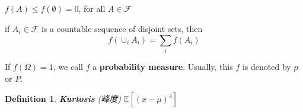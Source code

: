 \documentclass{article}
\newtheorem{definition}{Definition}
\begin{document}
\begin{description}[nosep]
  \item[] $f(A) \leq f(\emptyset) = 0$, for all $A \in \mathcal{F}$
  \item[] if $A_i \in \mathcal{F}$ is a countable sequence of disjoint sets, then
  \[ f(\cup_i A_i) = \sum_i f(A_i) \]
\end{description}

If $f(\Omega) = 1$, we call $f$ a \textbf{probability measure}. Usually, this $f$ is denoted by $p$ or $P$.

\begin{definition}
  \textbf{Kurtosis} (峰度) $\mathbb{E}[(x - \mu)^4]$
\end{definition}

\
\end{document}
